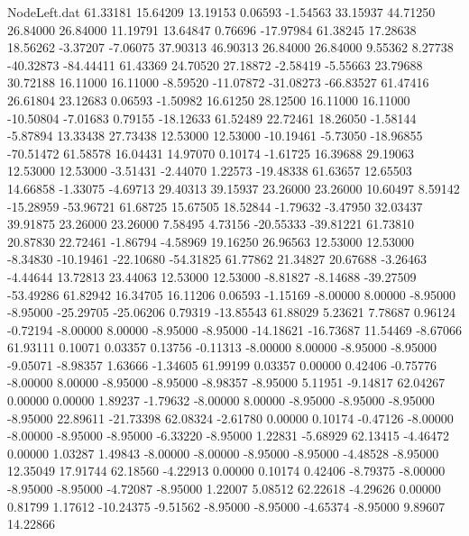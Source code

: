 \begin{filecontents}{NodeLeft.dat}
  61.33181   15.64209   13.19153     0.06593   -1.54563   33.15937   44.71250   26.84000   26.84000   11.19791   13.64847    0.76696  -17.97984
  61.38245   17.28638   18.56262    -3.37207   -7.06075   37.90313   46.90313   26.84000   26.84000    9.55362    8.27738  -40.32873  -84.44411
  61.43369   24.70520   27.18872    -2.58419   -5.55663   23.79688   30.72188   16.11000   16.11000   -8.59520  -11.07872  -31.08273  -66.83527
  61.47416   26.61804   23.12683     0.06593   -1.50982   16.61250   28.12500   16.11000   16.11000  -10.50804   -7.01683    0.79155  -18.12633
  61.52489   22.72461   18.26050    -1.58144   -5.87894   13.33438   27.73438   12.53000   12.53000  -10.19461   -5.73050  -18.96855  -70.51472
  61.58578   16.04431   14.97070     0.10174   -1.61725   16.39688   29.19063   12.53000   12.53000   -3.51431   -2.44070    1.22573  -19.48338
  61.63657   12.65503   14.66858    -1.33075   -4.69713   29.40313   39.15937   23.26000   23.26000   10.60497    8.59142  -15.28959  -53.96721
  61.68725   15.67505   18.52844    -1.79632   -3.47950   32.03437   39.91875   23.26000   23.26000    7.58495    4.73156  -20.55333  -39.81221
  61.73810   20.87830   22.72461    -1.86794   -4.58969   19.16250   26.96563   12.53000   12.53000   -8.34830  -10.19461  -22.10680  -54.31825
  61.77862   21.34827   20.67688    -3.26463   -4.44644   13.72813   23.44063   12.53000   12.53000   -8.81827   -8.14688  -39.27509  -53.49286
  61.82942   16.34705   16.11206     0.06593   -1.15169   -8.00000    8.00000   -8.95000   -8.95000  -25.29705  -25.06206    0.79319  -13.85543
  61.88029    5.23621    7.78687     0.96124   -0.72194   -8.00000    8.00000   -8.95000   -8.95000  -14.18621  -16.73687   11.54469   -8.67066
  61.93111    0.10071    0.03357     0.13756   -0.11313   -8.00000    8.00000   -8.95000   -8.95000   -9.05071   -8.98357    1.63666   -1.34605
  61.99199    0.03357    0.00000     0.42406   -0.75776   -8.00000    8.00000   -8.95000   -8.95000   -8.98357   -8.95000    5.11951   -9.14817
  62.04267    0.00000    0.00000     1.89237   -1.79632   -8.00000    8.00000   -8.95000   -8.95000   -8.95000   -8.95000   22.89611  -21.73398
  62.08324   -2.61780    0.00000     0.10174   -0.47126   -8.00000   -8.00000   -8.95000   -8.95000   -6.33220   -8.95000    1.22831   -5.68929
  62.13415   -4.46472    0.00000     1.03287    1.49843   -8.00000   -8.00000   -8.95000   -8.95000   -4.48528   -8.95000   12.35049   17.91744
  62.18560   -4.22913    0.00000     0.10174    0.42406   -8.79375   -8.00000   -8.95000   -8.95000   -4.72087   -8.95000    1.22007    5.08512
  62.22618   -4.29626    0.00000     0.81799    1.17612  -10.24375   -9.51562   -8.95000   -8.95000   -4.65374   -8.95000    9.89607   14.22866

\end{filecontents}
